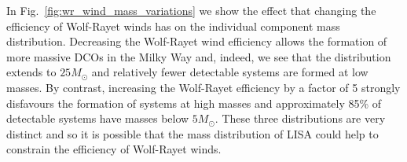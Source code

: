 In Fig.~\ref{fig:wr_wind_mass_variations} we show the effect that changing the efficiency of Wolf-Rayet winds has on the individual component mass distribution. Decreasing the Wolf-Rayet wind efficiency allows the formation of more massive DCOs in the Milky Way and, indeed, we see that the distribution extends to $25 \unit{M_{\odot}}$ and relatively fewer detectable systems are formed at low masses. By contrast, increasing the Wolf-Rayet efficiency by a factor of 5 strongly disfavours the formation of systems at high masses and approximately 85\% of detectable systems have masses below $5 \unit{M_{\odot}}$. These three distributions are very distinct and so it is possible that the mass distribution of LISA could help to constrain the efficiency of Wolf-Rayet winds.
